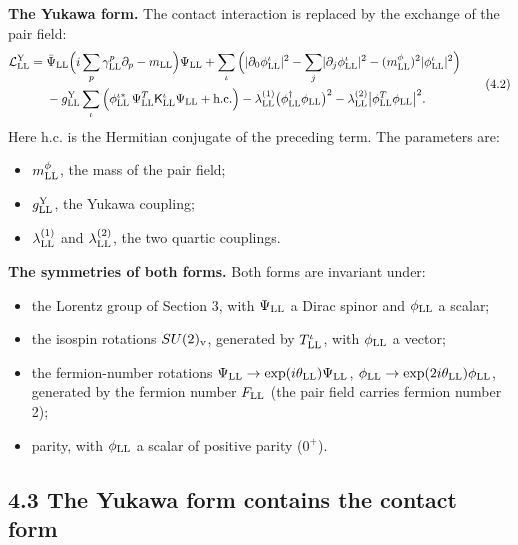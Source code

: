 \documentclass[
  10pt,
]{article}
\providecommand{\tightlist}{%
  \setlength{\itemsep}{0pt}\setlength{\parskip}{0pt}}
\begin{document}
\textbf{The Yukawa form.} The contact interaction is replaced by the
exchange of the pair field:
\[\begin{aligned}\mathcal L^{\rm Y}_{\rm LL}={}&\bar\Psi_{\rm LL}\Big(i\sum_p\gamma^p_{\rm LL}\partial_p-m_{\rm LL}\Big)\Psi_{\rm LL}+\sum_\iota\Big(\lvert\partial_0\phi^\iota_{\rm LL}\rvert^2-\sum_j\lvert\partial_j\phi^\iota_{\rm LL}\rvert^2-(m^\phi_{\rm LL})^2\lvert\phi^\iota_{\rm LL}\rvert^2\Big)\\&-g^{\rm Y}_{\rm LL}\sum_\iota\Big(\phi^{\iota*}_{\rm LL}\,\Psi^T_{\rm LL}\mathsf K^\iota_{\rm LL}\Psi_{\rm LL}+\text{h.c.}\Big)-\lambda^{(1)}_{\rm LL}\big(\phi^\dagger_{\rm LL}\phi_{\rm LL}\big)^2-\lambda^{(2)}_{\rm LL}\big\lvert\phi^T_{\rm LL}\phi_{\rm LL}\big\rvert^2 .\end{aligned} \tag{4.2}\]
Here h.c. is the Hermitian conjugate of the preceding term. The
parameters are:

\begin{itemize}
\tightlist
\item
  \(m^\phi_{\rm LL}\), the mass of the pair field;
\item
  \(g^{\rm Y}_{\rm LL}\), the Yukawa coupling;
\item
  \(\lambda^{(1)}_{\rm LL}\) and \(\lambda^{(2)}_{\rm LL}\), the two
  quartic couplings.
\end{itemize}

\textbf{The symmetries of both forms.} Both forms are invariant under:

\begin{itemize}
\tightlist
\item
  the Lorentz group of Section 3, with \(\Psi_{\rm LL}\) a Dirac spinor
  and \(\phi_{\rm LL}\) a scalar;
\item
  the isospin rotations \(SU(2)_{\rm v}\), generated by
  \(T^\iota_{\rm LL}\), with \(\phi_{\rm LL}\) a vector;
\item
  the fermion-number rotations
  \(\Psi_{\rm LL}\to\exp(i\theta_{\rm LL})\Psi_{\rm LL}\),
  \(\phi_{\rm LL}\to\exp(2i\theta_{\rm LL})\phi_{\rm LL}\), generated by
  the fermion number \(F_{\rm LL}\) (the pair field carries fermion
  number 2);
\item
  parity, with \(\phi_{\rm LL}\) a scalar of positive parity (\(0^+\)).
\end{itemize}

\hypertarget{the-yukawa-form-contains-the-contact-form}{%
\subsection{4.3 The Yukawa form contains the contact
form}\label{the-yukawa-form-contains-the-contact-form}}
\end{document}
